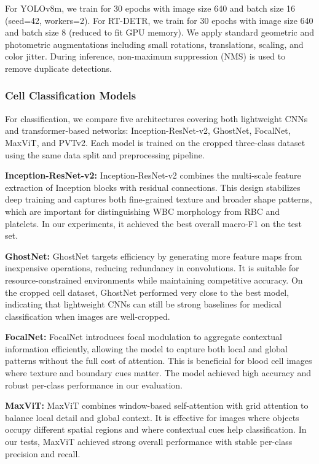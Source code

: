 \documentclass[conference]{IEEEtran}
\begin{document}
For YOLOv8m, we train for 30 epochs with image size 640 and batch size 16 (seed=42, workers=2). For RT-DETR, we train for 30 epochs with image size 640 and batch size 8 (reduced to fit GPU memory). We apply standard geometric and photometric augmentations including small rotations, translations, scaling, and color jitter. During inference, non-maximum suppression (NMS) is used to remove duplicate detections.

\subsubsection{Cell Classification Models}

For classification, we compare five architectures covering both lightweight CNNs and transformer-based networks: Inception-ResNet-v2, GhostNet, FocalNet, MaxViT, and PVTv2. Each model is trained on the cropped three-class dataset using the same data split and preprocessing pipeline.

\textbf{Inception-ResNet-v2:} Inception-ResNet-v2 combines the multi-scale feature extraction of Inception blocks with residual connections. This design stabilizes deep training and captures both fine-grained texture and broader shape patterns, which are important for distinguishing WBC morphology from RBC and platelets. In our experiments, it achieved the best overall macro-F1 on the test set.

\textbf{GhostNet:} GhostNet targets efficiency by generating more feature maps from inexpensive operations, reducing redundancy in convolutions. It is suitable for resource-constrained environments while maintaining competitive accuracy. On the cropped cell dataset, GhostNet performed very close to the best model, indicating that lightweight CNNs can still be strong baselines for medical classification when images are well-cropped.

\textbf{FocalNet:} FocalNet introduces focal modulation to aggregate contextual information efficiently, allowing the model to capture both local and global patterns without the full cost of attention. This is beneficial for blood cell images where texture and boundary cues matter. The model achieved high accuracy and robust per-class performance in our evaluation.

\textbf{MaxViT:} MaxViT combines window-based self-attention with grid attention to balance local detail and global context. It is effective for images where objects occupy different spatial regions and where contextual cues help classification. In our tests, MaxViT achieved strong overall performance with stable per-class precision and recall.
\end{document}
